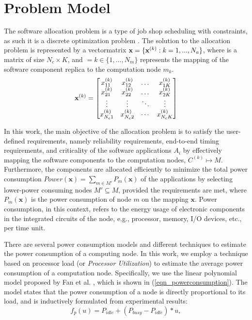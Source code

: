 \section{Problem Model}\label{sec_extrafunc}
The software allocation problem is a type of job shop scheduling with constraints, as such it is a discrete optimization problem \cite{}. The solution to the allocation problem is represented by a vectormatrix $\textbf{x}=\{\textbf{x}^{(k)}:k=1,...,N_a\}$, where  is a matrix of size $N_c\times K$, and $=k\in \{1,…,N_m\}$ represents the mapping of the software component replica  to the computation node $m_k$.
\begin{equation}
\label{fig_pso_solution_representation}
\textbf{x}^{(k)}=
\begin{bmatrix} 
x^{(k)}_{11} & x^{(k)}_{12} & \dots & x^{(k)}_{1K}\\
x^{(k)}_{21} & x^{(k)}_{22} & \dots & x^{(k)}_{2K}\\
\vdots & \vdots & \ddots & \vdots\\
x^{(k)}_{N_c1} & x^{(k)}_{N_c2} & \cdots & x^{(k)}_{N_cK}
\end{bmatrix}
\end{equation}

In this work, the main objective of the allocation problem is to satisfy the user-defined requirements, namely reliability requirements, end-to-end timing requirements, and criticality of the software applications $A_i$ by effectively mapping the software components to the computation nodes, $C^{(k)}\mapsto M$. Furthermore, the components are allocated efficiently to minimize the total power consumption $Power(\textbf{x})=\sum_{m\in M'}{P_{m}(\textbf{x})}$ of the applications by selecting lower-power consuming nodes $M'\subseteq M$, provided the requirements are met, where $P_{m}(\textbf{x})$ is the power consumption of node $m$ on the mapping $\textbf{x}$. Power consumption, in this context, refers to the energy usage of electronic components in the integrated circuits of the node, e.g., processor, memory, I/O devices, etc., per time unit. 

There are several power consumption models and different techniques to estimate the power consumption of a computing node. In this work, we employ a technique based on processor load (or \textit{Processor Utilization}) to estimate the average power consumption of a computation node. Specifically, we use the linear polynomial model proposed by Fan et al. \cite{Fan2007PowerComputer}, which is shown in (\ref{eqn_powerconsumption}). The model states that the power consumption of a node is directly proportional to its load, and is inductively formulated from experimental results:
\begin{equation}
\label{eqn_powerconsumption}
f_p(u)=P_{idle} + (P_{busy}-P_{idle})*u,
\end{equation}

